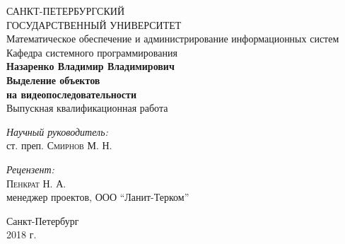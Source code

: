 \documentclass[aps,%
14pt,%
final,%
oneside,
onecolumn,%
musixtex, %
superscriptaddress,%
centertags]{extarticle} %
\begin{document}
\begin{titlepage} 
\begin{center}
{\large САНКТ-ПЕТЕРБУРГСКИЙ \\ ГОСУДАРСТВЕННЫЙ УНИВЕРСИТЕТ} \\[1.0cm]
{\large Математическое обеспечение и администрирование информационных систем} \\[0.2cm]
{\large Кафедра системного программирования} \\[3.5cm]
 
\textbf{\Large Назаренко Владимир Владимирович} \\[1cm]
\textbf{\LARGE Выделение объектов}\\[2mm]
\textbf{\LARGE на видеопоследовательности}\\[1.0cm]
{\Large Выпускная квалификационная работа} \\[3.5cm]

\begin{flushright} \large
\emph{Научный руководитель:} \\
ст. преп. \textsc{Смирнов М. Н.}
\end{flushright}
 \begin{flushright} \large
\emph{Рецензент:} \\
\textsc{Пенкрат Н. А.} \\
менеджер проектов, ООО ``Ланит-Терком''
\end{flushright}
\vfill 

{\large {Санкт-Петербург}} \\[2mm]
{\large {2018 г.}}
\end{center} 
\end{titlepage}
\end{document}
